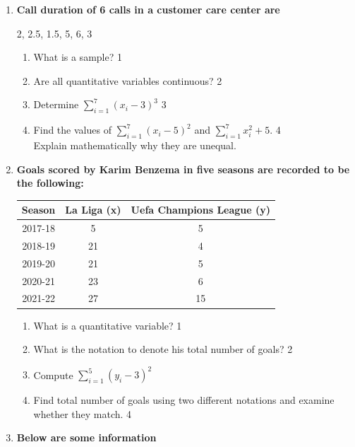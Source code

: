 \documentclass[a4paper,oneside]{book}
\begin{document}
\begin{enumerate}
   \item
  \textbf{Call duration of 6 calls in a customer care center are}
  
  \begin{center}
  2, 2.5, 1.5, 5, 6, 3
  \end{center}
 
  \begin{enumerate}
    \item
	What is a sample? \hfill 1
    \item
    	Are all quantitative variables continuous?  \hfill 2
    \item
    	Determine $\displaystyle \sum_{i=1}^7 (x_i-3)^3$ \hfill 3
     \item
     	Find the values of  $\displaystyle \sum_{i=1}^7 (x_i-5)^2$ and $\displaystyle \sum_{i=1}^7 x_i^2+5.$  \hfill 4 \\
     	Explain mathematically why they are unequal.
  \end{enumerate}
  
   \item
	  \textbf{Goals scored by Karim Benzema in five seasons are recorded to be the following:} 
	  
	  \begin{table}[h]
	  \centering
\begin{tabular}{c|c|c}
Season & La Liga (x) & Uefa Champions League (y) \\ \hline
2017-18 & 5 & 5 \\ 
2018-19 & 21 & 4 \\
2019-20 & 21 & 5 \\
2020-21 & 23 & 6 \\ 
2021-22 & 27 & 15 \\ \hline
\end{tabular}
\end{table}
  
  \begin{enumerate}
    \item
	What is a quantitative variable? \hfill 1
    \item
	What is the notation to denote his total number of goals? \hfill 2
    \item  
	Compute $\displaystyle \sum_{i=1}^5 (y_i - 3)^2$ \hfill 
    \item
	Find total number of goals using two different notations and examine whether they match. \hfill 4
  \end{enumerate}

  
 \item
	  \textbf{Below are some information} 
  

\end{enumerate}
\end{document}
